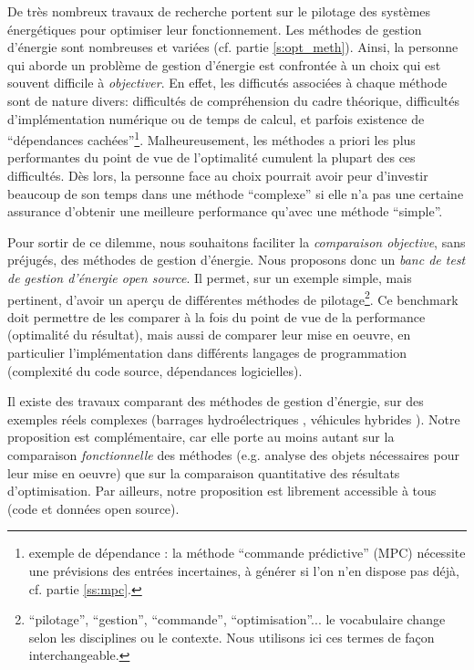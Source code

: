 \documentclass[a4paper,10pt,twocolumn]{article}
\begin{document}
De très nombreux travaux de recherche portent sur le pilotage des systèmes énergétiques
pour optimiser leur fonctionnement.
Les méthodes de gestion d'énergie sont nombreuses et variées (cf. partie \ref{s:opt_meth}).
Ainsi, la personne qui aborde un problème de gestion d'énergie
est confrontée à un choix qui est souvent difficile à \emph{objectiver}.
En effet, les difficutés associées à chaque méthode sont de nature divers:
difficultés de compréhension du cadre théorique, difficultés d'implémentation
numérique ou de temps de calcul, et parfois existence de
``dépendances cachées''\footnote{
  exemple de dépendance : la méthode ``commande prédictive'' (MPC)
  nécessite une prévisions des entrées incertaines,
  à générer si l'on n'en dispose pas déjà, cf. partie \ref{ss:mpc}.}.
Malheureusement, les méthodes a priori les plus performantes du point de vue de l'optimalité
cumulent la plupart des ces difficultés.
Dès lors, la personne face au choix pourrait avoir peur d'investir beaucoup de son temps
dans une méthode ``complexe'' si elle n'a pas une certaine assurance d'obtenir une meilleure
performance qu'avec une méthode ``simple''.

Pour sortir de ce dilemme, nous souhaitons faciliter la \emph{comparaison objective},
sans préjugés, des méthodes de gestion d'énergie.
Nous proposons donc un \emph{banc de test de gestion d'énergie open source}.
Il permet, sur un exemple simple, mais pertinent, d'avoir un aperçu de différentes méthodes
de pilotage\footnote{``pilotage'', ``gestion'', ``commande'', ``optimisation''...
le vocabulaire change selon les disciplines ou le contexte.
Nous utilisons ici ces termes de façon interchangeable.}.
Ce benchmark doit permettre de les comparer
à la fois du point de vue de la performance (optimalité du résultat),
mais aussi de comparer leur mise en oeuvre, en particulier l'implémentation
dans différents langages de programmation (complexité du code source, dépendances logicielles).

Il existe des travaux comparant des méthodes de gestion d'énergie, sur des exemples réels complexes
(barrages hydroélectriques \cite{Zambelli:2011:SBA}, véhicules hybrides \cite{Jiang:2017:ToVT}).
Notre proposition est complémentaire, car elle porte au moins autant sur la comparaison \emph{fonctionnelle}
des méthodes (e.g. analyse des objets nécessaires pour leur mise en oeuvre) que
sur la comparaison quantitative des résultats d'optimisation.
Par ailleurs, notre proposition est librement accessible à tous (code et données open source).
\end{document}
